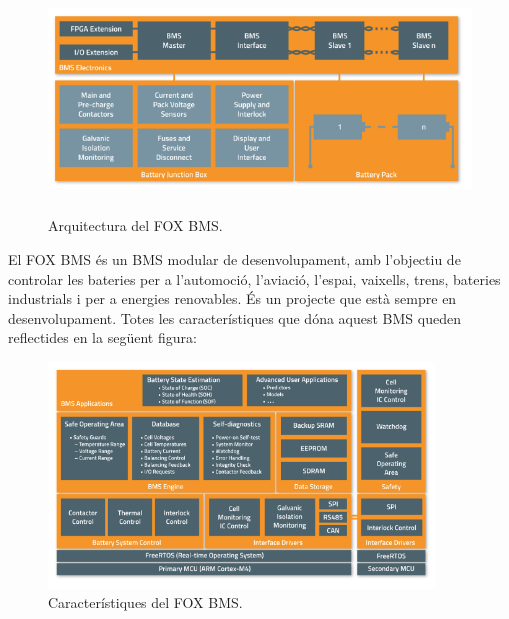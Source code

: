 \begin{figure}[H]
		\centering
   	\includegraphics[width=\textwidth, height=6cm]{Marcteoric/estructurafoxbms.png}
     	\caption{Arquitectura del FOX BMS.} 
\end{figure}

El FOX BMS és un BMS modular de desenvolupament, amb l'objectiu de controlar les bateries per a l'automoció, l'aviació, l'espai, vaixells, trens, bateries industrials i per a energies renovables. És un projecte que està sempre en desenvolupament. Totes les característiques que dóna aquest BMS queden reflectides en la següent figura:

\begin{figure}[H]
		\centering
   	\includegraphics[width=\textwidth, height=6cm]{Marcteoric/aplicacionesfoxbms.png}
     	\caption{Característiques del FOX BMS.} 
\end{figure}

